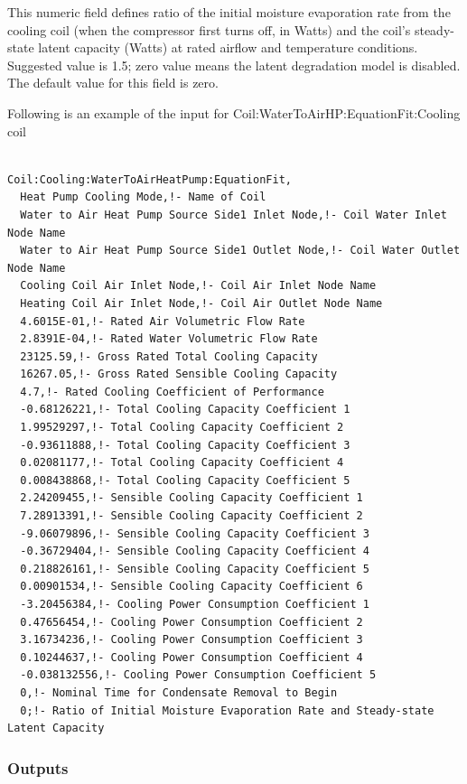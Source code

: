 This numeric field defines ratio of the initial moisture evaporation rate from the cooling coil (when the compressor first turns off, in Watts) and the coil's steady-state latent capacity (Watts) at rated airflow and temperature conditions. Suggested value is 1.5; zero value means the latent degradation model is disabled. The default value for this field is zero.

Following is an example of the input for Coil:WaterToAirHP:EquationFit:Cooling coil

\begin{lstlisting}

Coil:Cooling:WaterToAirHeatPump:EquationFit,
  Heat Pump Cooling Mode,!- Name of Coil
  Water to Air Heat Pump Source Side1 Inlet Node,!- Coil Water Inlet Node Name
  Water to Air Heat Pump Source Side1 Outlet Node,!- Coil Water Outlet Node Name
  Cooling Coil Air Inlet Node,!- Coil Air Inlet Node Name
  Heating Coil Air Inlet Node,!- Coil Air Outlet Node Name
  4.6015E-01,!- Rated Air Volumetric Flow Rate
  2.8391E-04,!- Rated Water Volumetric Flow Rate
  23125.59,!- Gross Rated Total Cooling Capacity
  16267.05,!- Gross Rated Sensible Cooling Capacity
  4.7,!- Rated Cooling Coefficient of Performance
  -0.68126221,!- Total Cooling Capacity Coefficient 1
  1.99529297,!- Total Cooling Capacity Coefficient 2
  -0.93611888,!- Total Cooling Capacity Coefficient 3
  0.02081177,!- Total Cooling Capacity Coefficient 4
  0.008438868,!- Total Cooling Capacity Coefficient 5
  2.24209455,!- Sensible Cooling Capacity Coefficient 1
  7.28913391,!- Sensible Cooling Capacity Coefficient 2
  -9.06079896,!- Sensible Cooling Capacity Coefficient 3
  -0.36729404,!- Sensible Cooling Capacity Coefficient 4
  0.218826161,!- Sensible Cooling Capacity Coefficient 5
  0.00901534,!- Sensible Cooling Capacity Coefficient 6
  -3.20456384,!- Cooling Power Consumption Coefficient 1
  0.47656454,!- Cooling Power Consumption Coefficient 2
  3.16734236,!- Cooling Power Consumption Coefficient 3
  0.10244637,!- Cooling Power Consumption Coefficient 4
  -0.038132556,!- Cooling Power Consumption Coefficient 5
  0,!- Nominal Time for Condensate Removal to Begin
  0;!- Ratio of Initial Moisture Evaporation Rate and Steady-state Latent Capacity
\end{lstlisting}

\subsubsection{Outputs}\label{outputs-25}

